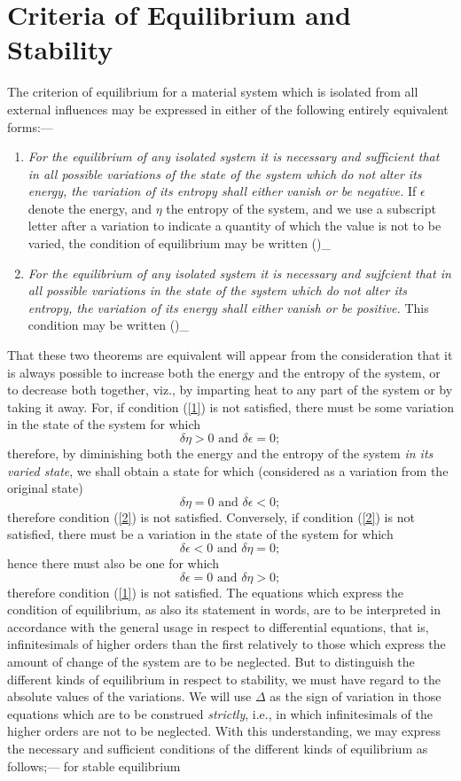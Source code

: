 \documentclass[12pt]{article}
\begin{document}
\section{Criteria of Equilibrium and Stability}
The criterion of equilibrium for a material system which is isolated from all external influences may be expressed in either of the following entirely equivalent forms:---
\begin{enumerate}
\item \textit{For the equilibrium of any isolated system it is necessary and sufficient that in all possible variations of the state of the system which do not alter its energy, the variation of its entropy shall either vanish or be negative.} If $\epsilon$ denote the energy, and $\eta$ the entropy of the system, and we use a subscript letter after a variation to indicate a quantity of which the value is not to be varied, the condition of equilibrium may be written
\eqs
 (\delta \eta)_{\epsilon}   \label{1}                     
\eqe
\item \textit{For the equilibrium of any isolated system it is necessary and sujfcient that in all possible variations in the state of the system which do not alter its entropy, the variation of its energy shall either vanish or be positive.}  This condition may be written
\eqs
(\delta \epsilon)_\eta {} \label{2}
\eqe                   
\end{enumerate}
That these two theorems are equivalent will appear from the consideration that it is always possible to increase both the energy and the entropy of the system, or to decrease both together, viz., by imparting heat to any part of the system or by taking it away. For, if condition (\ref{1}) is not satisfied, there must be some variation in the state of the system for which
$$\delta \eta > 0 \text{  and }  \delta \epsilon = 0;$$
therefore, by diminishing both the energy and the entropy of the system \textit{in its varied state}, we shall obtain a state for which (considered as a variation from the original state)
$$\delta \eta = 0 \text{  and }  \delta \epsilon <0;$$
therefore condition (\ref{2}) is not satisfied. Conversely, if condition (\ref{2}) is not satisfied, there must be a variation in the state of the system for which
$$\delta \epsilon < 0 \text{  and }  \delta \eta =0;$$
hence there must also be one for which
$$\delta \epsilon = 0 \text{  and }  \delta \eta >0;$$
therefore condition (\ref{1}) is not satisfied.
The equations which express the condition of equilibrium, as also its statement in words, are to be interpreted in accordance with the general usage in respect to differential equations, that is, infinitesimals of higher orders than the first relatively to those which express the amount of change of the system are to be neglected. But to distinguish the different kinds of equilibrium in respect to stability, we must have regard to the absolute values of the variations. We will use $\Delta$ as the sign of variation in those equations which are to be construed \emph{strictly}, i.e., in which infinitesimals of the higher orders are not to be neglected. With this understanding, we may express the necessary and sufficient conditions of the different kinds of equilibrium as follows;--- for stable equilibrium
\end{document}
